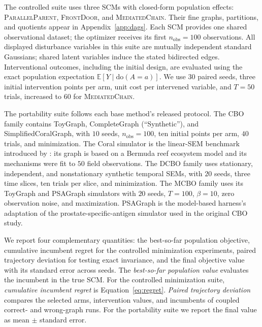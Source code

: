 \documentclass[twoside]{article}
\newcommand{\E}{\mathbb{E}}
\newcommand{\doo}{\mathrm{do}}
\begin{document}
The controlled suite uses three SCMs with closed-form population effects:
\textsc{ParallelParent}, \textsc{FrontDoor}, and \textsc{MediatedChain}.
Their fine graphs, partitions, and quotients appear in Appendix~\ref{app:dags}. Each SCM provides one shared observational dataset; the optimizer receives its first $n_{\mathrm{obs}}=100$ observations. All displayed disturbance variables in this suite are mutually independent standard Gaussians; shared latent variables induce the stated bidirected edges. Interventional outcomes, including the initial design, are evaluated using the exact population expectation $\E[Y\mid\doo(A=a)]$. We use $30$ paired seeds, three initial intervention points per arm, unit cost per intervened variable, and $T=50$ trials, increased to $60$ for
\textsc{MediatedChain}.

The portability suite follows each base method's released protocol. The CBO family contains ToyGraph, CompleteGraph (``Synthetic''), and SimplifiedCoralGraph, with $10$ seeds, $n_{\mathrm{obs}}=100$, ten initial points per arm, $40$ trials, and minimization. The Coral simulator is the linear-SEM benchmark introduced by \citet{agliettiCausalBayesianOptimization2020b}: its graph is based on a Bermuda reef ecosystem model and its mechanisms were fit to $50$ field observations. The DCBO family uses stationary, independent, and nonstationary synthetic temporal SEMs, with $20$ seeds, three time slices, ten trials per slice, and minimization. The MCBO family uses its ToyGraph and PSAGraph simulators with $20$ seeds, $T=100$, $\beta=10$, zero observation noise, and maximization. PSAGraph is the model-based harness's adaptation of the prostate-specific-antigen simulator used in the original CBO study.

We report four complementary quantities: the best-so-far population objective, cumulative incumbent regret for the controlled minimization experiments, paired trajectory deviation for testing exact invariance, and the final objective value with its standard error across seeds. The \emph{best-so-far population value} evaluates the incumbent in the true SCM. For the controlled minimization suite, \emph{cumulative incumbent regret} is Equation~\eqref{eq:regret}. \emph{Paired trajectory deviation} compares the selected arms, intervention values, and incumbents of coupled correct- and wrong-graph runs. For the portability suite we report the final value as mean $\pm$ standard error.
\end{document}
